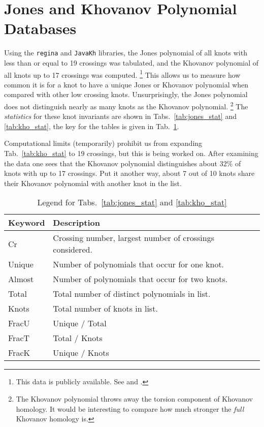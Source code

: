 \documentclass{article}
\theoremstyle{plain}
\begin{document}
    \section{Jones and Khovanov Polynomial Databases}
        Using the \texttt{regina} and \texttt{JavaKh} libraries, the Jones
        polynomial of all knots with less than or equal to 19 crossings was
        tabulated, and the Khovanov polynomial of all knots up to 17 crossings
        was computed.%
        \footnote{%
            This data is publicly available. See
            \cite{JonesData} and \cite{KhovanovData}.
        }
        This allows us to measure how common it is for a knot
        to have a unique Jones or Khovanov polynomial when compared with other
        low crossing knots. Unsurprisingly, the Jones polynomial does not
        distinguish nearly as many knots as the Khovanov polynomial.%
        \footnote{%
            The Khovanov polynomial throws away the torsion component of
            Khovanov homology. It would be interesting to compare how much
            stronger the \textit{full} Khovanov homology is.
        }
        The \textit{statistics} for these knot invariants are shown in
        Tabs.~\ref{tab:jones_stat} and \ref{tab:kho_stat}, the key for the
        tables is given in Tab.~\ref{tab:key}.
        \par\hfill\par
        Computational limits (temporarily) prohibit us from expanding
        Tab.~\ref{tab:kho_stat} to 19 crossings, but this is being worked on.
        After examining the data one sees that the Khovanov polynomial
        distinguishes about $32\%$ of knots with up to 17 crossings. Put it
        another way, about 7 out of 10 knots share their Khovanov polynomial
        with another knot in the list.
        \begin{table}
            \centering
            \begin{tabular}{| l | l |}
                \hline
                Keyword & Description\\
                \hline
                Cr     & Crossing number, largest number of crossings considered.\\
                Unique & Number of polynomials that occur for one knot.\\
                Almost & Number of polynomials that occur for two knots.\\
                Total  & Total number of distinct polynomials in list.\\
                Knots  & Total number of knots in list.\\
                FracU  & Unique / Total\\
                FracT  & Total / Knots\\
                FracK  & Unique / Knots\\
                \hline
            \end{tabular}
            \caption{Legend for Tabs.~\ref{tab:jones_stat} and \ref{tab:kho_stat}}
            \label{tab:key}
        \end{table}
\end{document}
